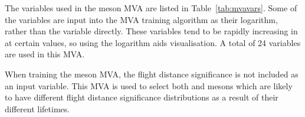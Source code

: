 The variables used in the \phiz meson MVA are listed in Table~\ref{tab:mvavars}. Some of the variables are input into the MVA training algorithm as their logarithm, rather than the variable directly. These variables tend to be rapidly increasing in at certain values, so using the logarithm aids visualisation. A total of 24 variables are used in this MVA.

When training the \phiz meson MVA, the flight distance significance is not included as an input variable. This MVA is used to select both \phiz and \Dzb mesons which are likely to have different flight distance significance distributions as a result of their different lifetimes. 


\begin{table}[h]
   \centering
      \begin{tabular}{ l l l c c}


\end{tabular}
\end{table}
